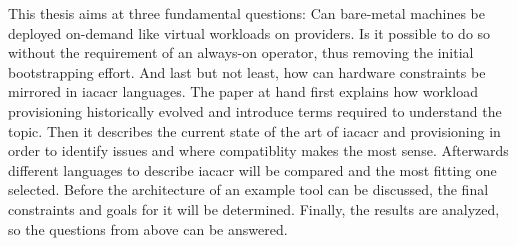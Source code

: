 \newline
This thesis aims at three fundamental questions: Can bare-metal machines be deployed on-demand like virtual workloads on providers. Is it possible to do so without the requirement of an always-on operator, thus removing the initial bootstrapping effort. And last but not least, how can hardware constraints be mirrored in \gls{iacacr} languages.
\newline
The paper at hand first explains how workload provisioning historically evolved and introduce terms required to understand the topic. Then it describes the current state of the art of \gls{iacacr} and provisioning in order to identify issues and where compatiblity makes the most sense. Afterwards different languages to describe \gls{iacacr} will be compared and the most fitting one selected.
Before the architecture of an example tool can be discussed, the final constraints and goals for it will be determined. Finally, the results are analyzed, so the questions from above can be answered.
